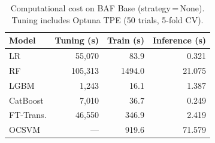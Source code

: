 \begin{table}[ht!]
\centering
\caption{Computational cost on BAF Base (strategy\,=\,None). Tuning includes Optuna TPE (50 trials, 5-fold CV).}
\label{tab:cost_baf}
\begin{tabular}{l r r r}
\toprule
Model & Tuning (s) & Train (s) & Inference (s) \\
\midrule
LR         & 55,070 & 83.9 & 0.321 \\
RF         & 105,313 & 1494.0 & 21.075 \\
LGBM       & 1,243 & 16.1 & 1.387 \\
CatBoost   & 7,010 & 36.7 & 0.249 \\
FT-Trans.  & 46,550 & 346.9 & 2.419 \\
OCSVM      & --- & 919.6 & 71.579 \\
\bottomrule
\end{tabular}
\end{table}